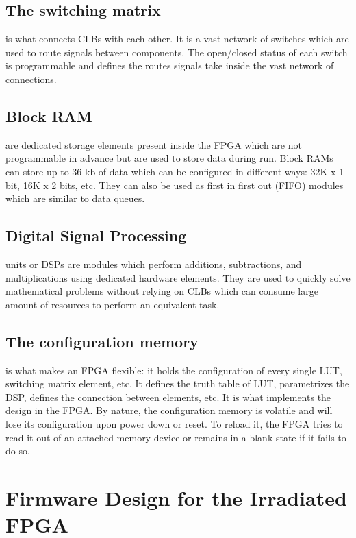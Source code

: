     \subsection{The switching matrix}

      is what connects CLBs with each other. It is a vast network of switches which are used to route signals between components. The open/closed status of each switch is programmable and defines the routes signals take inside the vast network of connections.

    \subsection{Block RAM}

      are dedicated storage elements present inside the FPGA which are not programmable in advance but are used to store data during run. Block RAMs can store up to 36 kb of data which can be configured in different ways: 32K x 1 bit, 16K x 2 bits, etc. They can also be used as first in first out (FIFO) modules which are similar to data queues.

    \subsection{Digital Signal Processing}

      units or DSPs are modules which perform additions, subtractions, and multiplications using dedicated hardware elements. They are used to quickly solve mathematical problems without relying on CLBs which can consume large amount of resources to perform an equivalent task.

    \subsection{The configuration memory}

      is what makes an FPGA flexible: it holds the configuration of every single LUT, switching matrix element, etc. It defines the truth table of LUT, parametrizes the DSP, defines the connection between elements, etc. It is what implements the design in the FPGA. By nature, the configuration memory is volatile and will lose its configuration upon power down or reset. To reload it, the FPGA tries to read it out of an attached memory device or remains in a blank state if it fails to do so.

  \section{Firmware Design for the Irradiated FPGA}

